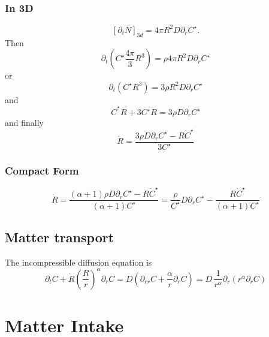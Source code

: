 \documentclass[11pt]{revtex4}
\begin{document}
\subsubsection{In 3D}
\begin{equation}
	\left[\partial_t N\right]_{3d} =  4\pi R^2 D \partial_r C^\star.
\end{equation}
Then
\begin{equation}
	\partial_t\left( C^\star \dfrac{4\pi}{3} R^3 \right) = \rho   4\pi R^2 D \partial_r C^\star
\end{equation}
or
\begin{equation}
	\partial_t\left( C^\star R^3\right) = 3\rho R^2 D \partial_r C^\star
\end{equation}
and
\begin{equation}
	\dot{C}^\star R + 3 C^\star \dot{R}  = 3\rho  D \partial_r C^\star
\end{equation}
and finally
\begin{equation}
	\dot{R} = \dfrac{3\rho  D \partial_r C^\star - R\dot{C}^\star}{3C^\star}
\end{equation}

\subsubsection{Compact Form}
\begin{equation}
	\dot{R} = \dfrac{(\alpha+1)\rho  D \partial_r C^\star - R\dot{C}^\star}{(\alpha+1)C^\star} = \dfrac{\rho}{C^\star} D\partial_rC^\star - \dfrac{R\dot{C}^\star}{\left(\alpha+1\right)C^\star}
\end{equation}

\subsection{Matter transport}
The incompressible diffusion equation is
\begin{equation}
	\partial_t C + \dot{R} \left(\dfrac{R}{r}\right)^\alpha  \partial_r C = D \left( \partial_{rr} C + \dfrac{\alpha}{r} \partial_r C \right) = D \, \dfrac{1}{r^\alpha} \partial_r \left(r^\alpha\partial_r C\right)
\end{equation}



\section{Matter Intake}
\end{document}
